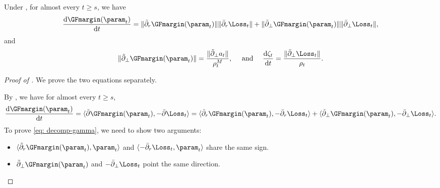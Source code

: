 \begin{lemma}
\label{lem:decomp-radial-spherical}
Under , for almost every $t\ge s$, we have  
\begin{equation}
\label{eq: decomp-gamma}
    \frac{\mathrm{d} \GFmargin(\param_t)}{ \mathrm{d} t} = \| \tilde  \partial_r \GFmargin(\param_t) \| \| \bar \partial_r \Loss_t\| + \| \tilde \partial_\perp \GFmargin(\param_t) \| \| \bar \partial_\perp \Loss_t\|,
\end{equation}
and 
\begin{equation}
\label{eq: decom-zeta}
\|\tilde \partial_\perp \GFmargin(\param_t) \|= \frac{\|\tilde \partial_\perp a_t\|}{ \rho_t^M} , \quad \text{ and } \quad \frac{\mathrm{d} \zeta_t}{\mathrm{d} t}  = \frac{\| \bar \partial_\perp \Loss_t\|}{\rho_t}.
\end{equation}
\begin{proof}[Proof of ]
We prove the two equations separately. 

 By , we have for almost every $t \ge s$, 
\[
    \frac{\mathrm{d}  \GFmargin(\param_t)}{\mathrm{d}  t} = \langle \tilde \partial \GFmargin(\param_t), - \bar \partial \Loss_t \rangle  = \langle \tilde \partial_r \GFmargin(\param_t), - \bar \partial_r \Loss_t \rangle + \langle \tilde \partial_\perp \GFmargin(\param_t), - \bar \partial_\perp \Loss_t \rangle.  
\]
To prove \eqref{eq: decomp-gamma}, we need to show two arguments: 
\begin{itemize}
    \item $\langle \tilde \partial_r \GFmargin(\param_t), \param_t \rangle$ and $\langle -\bar  \partial_r \Loss_t, \param_t \rangle  $ share the same sign. 
    \item $\tilde \partial_\perp \GFmargin(\param_t)$ and $-\bar \partial_\perp \Loss_t$ point the same direction.  
\end{itemize}


\end{proof}
\end{lemma}
